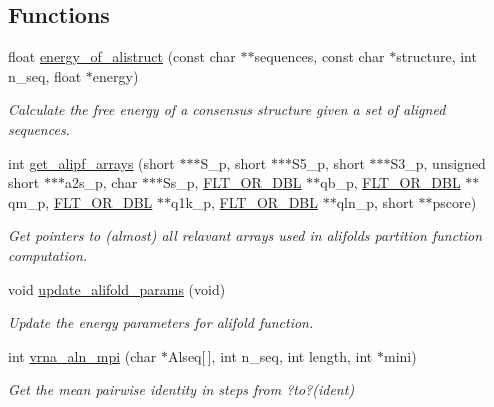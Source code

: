 \subsection*{Functions}
\begin{DoxyCompactItemize}
\item 
float \hyperlink{group__consensus__fold_ga1c48869c03b49a342bf4cbdd61900081}{energy\+\_\+of\+\_\+alistruct} (const char $\ast$$\ast$sequences, const char $\ast$structure, int n\+\_\+seq, float $\ast$energy)
\begin{DoxyCompactList}\small\item\em Calculate the free energy of a consensus structure given a set of aligned sequences. \end{DoxyCompactList}\item 
int \hyperlink{group__consensus__fold_ga5349960075b1847720a2e9df021e2675}{get\+\_\+alipf\+\_\+arrays} (short $\ast$$\ast$$\ast$S\+\_\+p, short $\ast$$\ast$$\ast$S5\+\_\+p, short $\ast$$\ast$$\ast$S3\+\_\+p, unsigned short $\ast$$\ast$$\ast$a2s\+\_\+p, char $\ast$$\ast$$\ast$Ss\+\_\+p, \hyperlink{group__data__structures_ga31125aeace516926bf7f251f759b6126}{F\+L\+T\+\_\+\+O\+R\+\_\+\+D\+BL} $\ast$$\ast$qb\+\_\+p, \hyperlink{group__data__structures_ga31125aeace516926bf7f251f759b6126}{F\+L\+T\+\_\+\+O\+R\+\_\+\+D\+BL} $\ast$$\ast$qm\+\_\+p, \hyperlink{group__data__structures_ga31125aeace516926bf7f251f759b6126}{F\+L\+T\+\_\+\+O\+R\+\_\+\+D\+BL} $\ast$$\ast$q1k\+\_\+p, \hyperlink{group__data__structures_ga31125aeace516926bf7f251f759b6126}{F\+L\+T\+\_\+\+O\+R\+\_\+\+D\+BL} $\ast$$\ast$qln\+\_\+p, short $\ast$$\ast$pscore)
\begin{DoxyCompactList}\small\item\em Get pointers to (almost) all relavant arrays used in alifold\textquotesingle{}s partition function computation. \end{DoxyCompactList}\item 
void \hyperlink{group__consensus__fold_gac484c6bd429bafbd353b91044508d8e9}{update\+\_\+alifold\+\_\+params} (void)
\begin{DoxyCompactList}\small\item\em Update the energy parameters for alifold function. \end{DoxyCompactList}\item 
int \hyperlink{group__consensus__fold_ga20fd17bb27891009af7ce839f5386177}{vrna\+\_\+aln\+\_\+mpi} (char $\ast$Alseq\mbox{[}$\,$\mbox{]}, int n\+\_\+seq, int length, int $\ast$mini)
\begin{DoxyCompactList}\small\item\em Get the mean pairwise identity in steps from ?to?(ident) \end{DoxyCompactList}\item 

\end{DoxyCompactItemize}
